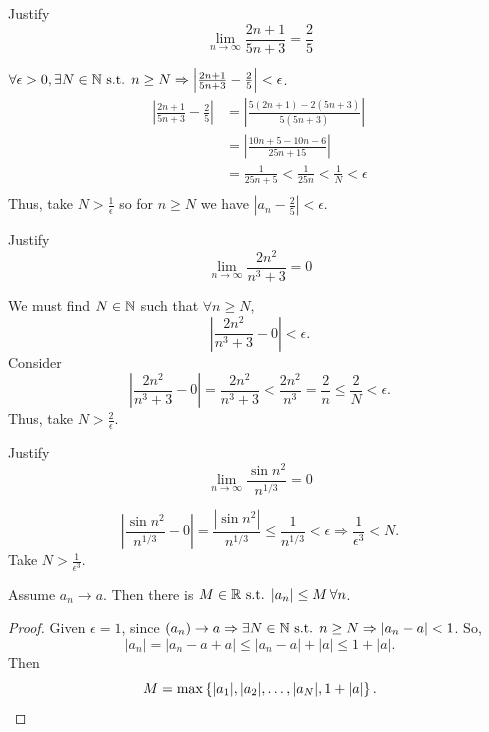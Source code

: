 \begin{example}{}{}
    Justify 
    \[
        \lim_{n\to\infty} \frac{2n+1}{5n+3} = \frac{2}{5} 
    \]
    \begin{solution}
        $\forall \epsilon > 0, \exists N \in \mathbb N \text{ s.t. } n \geq N \Rightarrow \left|\frac{2n+1}{5n+3} - \frac{2}{5}\right| < \epsilon$.
        \begin{align*}
            \left|\frac{2n+1}{5n+3} - \frac{2}{5}\right| &= \left|\frac{5(2n+1) - 2(5n+3)}{5(5n+3)}\right| \\
            &= \left|\frac{10n + 5 - 10n - 6}{25n + 15}\right| \\
            &= \frac{1}{25n + 5} < \frac{1}{25n} < \frac{1}{N} < \epsilon \\
        \end{align*}
        Thus, take $N > \frac{1}{\epsilon}$ so for $n \geq N$ we have $|a_n - \frac{2}{5}| < \epsilon$.
    \end{solution}
\end{example}

\begin{example}{}{}
    Justify 
    \[
        \lim_{n\to\infty} \frac{2n^2}{n^3 + 3} = 0
    \]
    \begin{solution}
        We must find $N \in \mathbb N$ such that $\forall n \geq N$, 
        \[
            \left|\frac{2n^2}{n^3 + 3} - 0\right| < \epsilon.
        \]
        Consider 
        \[
            \left|\frac{2n^2}{n^3 + 3} - 0\right| = \frac{2n^2}{n^3 + 3} < \frac{2n^2}{n^3} = \frac{2}{n} \leq \frac{2}{N}  < \epsilon.
        \]
        Thus, take $N > \frac{2}{\epsilon}$.
    \end{solution}
\end{example}

\begin{example}{}{}
    Justify 
    \[
        \lim_{n\to\infty} \frac{\sin n^2}{n^{1/3}} = 0 
    \]
    \begin{solution}
        \[
            \left|\frac{\sin n^2}{n^{1/3}} - 0\right| = \frac{|\sin n^2|}{n^{1/3}} \leq \frac{1}{n^{1/3}} < \epsilon \Rightarrow \frac{1}{\epsilon^3} < N.
        \]
        Take $N > \frac{1}{\epsilon^3}$.
    \end{solution}
\end{example}

\begin{thm}{}{}
    Assume $a_n \to a$. Then there is $M \in \mathbb R \text{ s.t. } |a_n| \leq M \,\forall n$. 
    \begin{proof}
        Given $\epsilon = 1$, since $(a_n) \to a \Rightarrow \exists N \in \mathbb N \text{ s.t. } n \geq N \Rightarrow |a_n - a| < 1$. So, 
        \[
            |a_n| = |a_n - a + a| \leq |a_n - a| + |a| \leq 1 + |a|.
        \]
        Then 
        \[
            M = \max\left\{|a_1|, |a_2|, \ldots, |a_N|, 1 + |a| \right\}. 
        \]
    \end{proof}
\end{thm}

